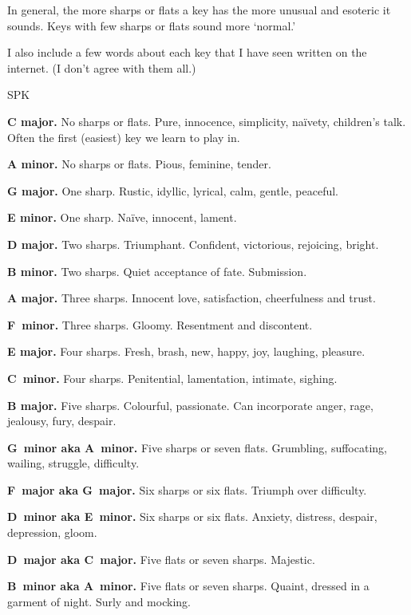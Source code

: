 In general, the more sharps or flats a key has the more unusual and
esoteric it sounds. Keys with few sharps or flats sound more `normal.'

I also include a few
words about each key that I have seen written on the internet.  (I 
don't agree with them all.)

\hfill SPK\break

\clearpage

\noindent\textbf{C major.}  No sharps or flats.
Pure, innocence, simplicity, naïvety, children's talk.  Often the
first (easiest) key we learn to play in.

\noindent\textbf{A minor.}  No sharps or flats.
Pious, feminine, tender.

\noindent\textbf{G major.}  One sharp.
Rustic, idyllic, lyrical, calm, gentle, peaceful.

\noindent\textbf{E minor.}  One sharp.
Na\"ive, innocent, lament.

\noindent\textbf{D major.}  Two sharps.
Triumphant. Confident, victorious, rejoicing, bright.

\noindent\textbf{B minor.}  Two sharps.
Quiet acceptance of fate. Submission.

\noindent\textbf{A major.}  Three sharps.
Innocent love, satisfaction, cheerfulness and trust.

\noindent\textbf{F\sh\ minor.}  Three sharps.
Gloomy. Resentment and discontent.

\noindent\textbf{E major.}  Four sharps.
Fresh, brash, new, happy, joy, laughing, pleasure.

\noindent\textbf{C\sh\ minor.}  Four sharps.
Penitential, lamentation, intimate, sighing.

\noindent\textbf{B major.}  Five sharps.
Colourful, passionate. Can incorporate anger, rage, jealousy, fury, despair.

\noindent\textbf{G\sh\ minor aka A\fl\ minor.}  Five sharps or seven flats.
Grumbling, suffocating, wailing, struggle, difficulty.

\noindent\textbf{F\sh\  major aka G\fl\ major.}  Six sharps or six flats.
Triumph over difficulty.

\noindent\textbf{D\sh\ minor aka E\fl\ minor.}  Six sharps or six flats.
Anxiety, distress,  despair,  depression, gloom.

\noindent\textbf{D\fl\ major aka C\sh\ major.}  Five flats or seven sharps.
Majestic.

\noindent\textbf{B\fl\ minor aka A\sh\ minor.}  Five flats or seven sharps.
Quaint, dressed in a garment of night. Surly and mocking.

